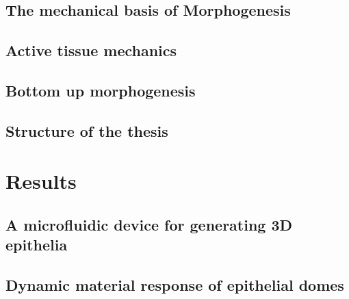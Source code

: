\documentclass[11pt, final, a4paper, twoside, openright]{book}
\begin{document}
	\renewcommand{\thesection}{2.\arabic{section}}
	\hypertarget{the-mechanical-basis-of-morphogenesis}{%
	\chapter{The mechanical basis of
	Morphogenesis}\label{the-mechanical-basis-of-morphogenesis}}
	
	
	\renewcommand{\thesection}{3.\arabic{section}}
	\hypertarget{active-tissue-mechanics}{%
	\chapter{Active tissue mechanics}\label{active-tissue-mechanics}}
	

	\renewcommand{\thesection}{4.\arabic{section}}
	\hypertarget{bottom-up-morphogenesis}{%
	\chapter{Bottom up morphogenesis}\label{bottom-up-morphogenesis}}
	
	
	\renewcommand{\thesection}{5.\arabic{section}}
	\hypertarget{structure-of-the-thesis}{%
	\chapter{Structure of the thesis}\label{structure-of-the-thesis}}
	
	
	\part{Results}
	\renewcommand{\thesection}{6.\arabic{section}}
	\hypertarget{a-microfluidic-system-for-generating-3d-epithelia-with-controlled-pressure-and-shape}{%
	\chapter{A microfluidic device for generating 3D epithelia}\label{a-microfluidic-system-for-generating-3d-epithelia-with-controlled-pressure-and-shape}}
	

	\renewcommand{\thesection}{7.\arabic{section}}
	\hypertarget{dynamic-material-response-of-epithelial-domes}{%
	\chapter{Dynamic material response of epithelial
	domes}\label{dynamic-material-response-of-epithelial-domes}}
	
\end{document}
